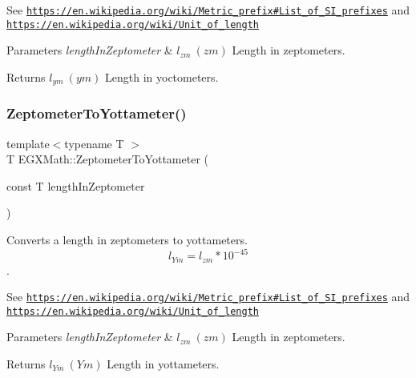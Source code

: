 See \href{https://en.wikipedia.org/wiki/Metric_prefix#List_of_SI_prefixes}{\tt https\+://en.\+wikipedia.\+org/wiki/\+Metric\+\_\+prefix\#\+List\+\_\+of\+\_\+\+S\+I\+\_\+prefixes} and \href{https://en.wikipedia.org/wiki/Unit_of_length}{\tt https\+://en.\+wikipedia.\+org/wiki/\+Unit\+\_\+of\+\_\+length} 
\begin{DoxyParams}{Parameters}
{\em length\+In\+Zeptometer} & $ l_{zm}\ (zm)$ Length in zeptometers. \\
\hline
\end{DoxyParams}
\begin{DoxyReturn}{Returns}
$ l_{ym}\ (ym)$ Length in yoctometers. 
\end{DoxyReturn}
\mbox{\label{group___e_g_x_math-_conversions-_length_conversions-_zeptometer-_s_i_gaac70660b1e189b20afff8dcd02dfb105}} 
\subsubsection{\texorpdfstring{Zeptometer\+To\+Yottameter()}{ZeptometerToYottameter()}}
{\footnotesize\ttfamily template$<$typename T $>$ \\
T E\+G\+X\+Math\+::\+Zeptometer\+To\+Yottameter (\begin{DoxyParamCaption}\item[{const T}]{length\+In\+Zeptometer }\end{DoxyParamCaption})}



Converts a length in zeptometers to yottameters. \[ l_{Ym}=l_{zm} * 10^{-45} \]. 

See \href{https://en.wikipedia.org/wiki/Metric_prefix#List_of_SI_prefixes}{\tt https\+://en.\+wikipedia.\+org/wiki/\+Metric\+\_\+prefix\#\+List\+\_\+of\+\_\+\+S\+I\+\_\+prefixes} and \href{https://en.wikipedia.org/wiki/Unit_of_length}{\tt https\+://en.\+wikipedia.\+org/wiki/\+Unit\+\_\+of\+\_\+length} 
\begin{DoxyParams}{Parameters}
{\em length\+In\+Zeptometer} & $ l_{zm}\ (zm)$ Length in zeptometers. \\
\hline
\end{DoxyParams}
\begin{DoxyReturn}{Returns}
$ l_{Ym}\ (Ym)$ Length in yottameters. 
\end{DoxyReturn}
\mbox{\label{group___e_g_x_math-_conversions-_length_conversions-_zeptometer-_s_i_ga73c5c0469d7d2aa9947293128c7aed73}} 
